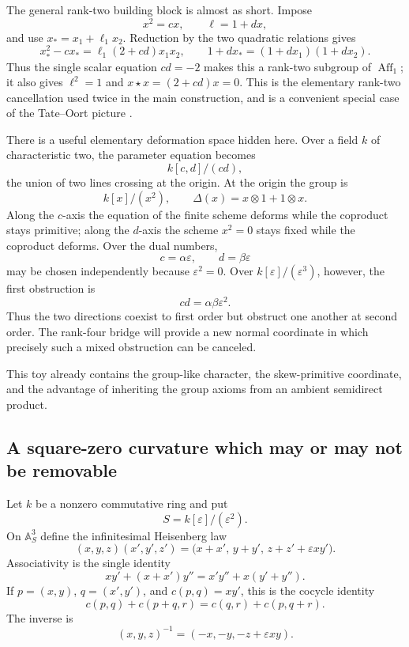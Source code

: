 \documentclass[11pt]{amsart}
\theoremstyle{definition}
\theoremstyle{remark}
\newcommand{\ot}{\otimes}
\begin{document}
The general rank-two building block is almost as short.  Impose
\[
 x^2=cx,\qquad \ell=1+dx,
\]
and use \(x_*=x_1+\ell_1x_2\).  Reduction by the two quadratic
relations gives
\begin{equation}\label{eq:toy-rank-two-cancellation}
 x_*^2-cx_*
 =\ell_1(2+cd)x_1x_2,
 \qquad
 1+dx_*=(1+dx_1)(1+dx_2).
\end{equation}
Thus the single scalar equation \(cd=-2\) makes this a rank-two subgroup
of \(\operatorname{Aff}_1\); it also gives
\(\ell^2=1\) and \(x\star x=(2+cd)x=0\).  This is the elementary rank-two cancellation
used twice in the main construction, and is a convenient special case
of the Tate--Oort picture \cite{OortTate}.

There is a useful elementary deformation space hidden here.  Over a
field \(k\) of characteristic two, the parameter equation becomes
\[
 k[c,d]/(cd),
\]
the union of two lines crossing at the origin.  At the origin the group
is
\[
 k[x]/(x^2),\qquad \Delta(x)=x\ot1+1\ot x.
\]
Along the \(c\)-axis the equation of the finite scheme deforms while the
coproduct stays primitive; along the \(d\)-axis the scheme \(x^2=0\)
stays fixed while the coproduct deforms.  Over the dual numbers,
\[
 c=\alpha\varepsilon,\qquad d=\beta\varepsilon
\]
may be chosen independently because \(\varepsilon^2=0\).  Over
\(k[\varepsilon]/(\varepsilon^3)\), however, the first obstruction is
\[
 cd=\alpha\beta\varepsilon^2.
\]
Thus the two directions coexist to first order but obstruct one another
at second order.  The rank-four bridge will provide a new normal
coordinate in which precisely such a mixed obstruction can be canceled.

This toy already contains the group-like character, the skew-primitive
coordinate, and the advantage of inheriting the group axioms from an
ambient semidirect product.

\subsection{A square-zero curvature which may or may not be removable}

Let \(k\) be a nonzero commutative ring and put
\[
 S=k[\varepsilon]/(\varepsilon^2).
\]
On \(\mathbb A^3_S\) define the infinitesimal Heisenberg law
\begin{equation}\label{eq:toy-heisenberg-law}
 (x,y,z)(x',y',z')
 =
 \bigl(x+x',\,y+y',\,z+z'+\varepsilon xy'\bigr).
\end{equation}
Associativity is the single identity
\[
 xy'+(x+x')y''
 =
 x'y''+x(y'+y'').
\]
If \(p=(x,y)\), \(q=(x',y')\), and \(c(p,q)=xy'\), this is the cocycle
identity
\begin{equation}\label{eq:toy-cocycle}
 c(p,q)+c(p+q,r)=c(q,r)+c(p,q+r).
\end{equation}
The inverse is
\[
 (x,y,z)^{-1}=(-x,-y,-z+\varepsilon xy).
\]
\end{document}
